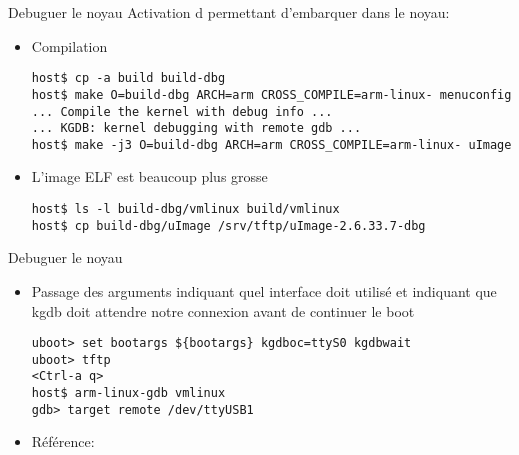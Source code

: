 \begin{frame}[fragile=singleslide]{Debuguer le noyau}
  Activation d  permettant d'embarquer  dans
  le noyau:
  \begin{itemize}
  \item Compilation
    \begin{lstlisting}
host$ cp -a build build-dbg
host$ make O=build-dbg ARCH=arm CROSS_COMPILE=arm-linux- menuconfig
... Compile the kernel with debug info ...
... KGDB: kernel debugging with remote gdb ...
host$ make -j3 O=build-dbg ARCH=arm CROSS_COMPILE=arm-linux- uImage
    \end{lstlisting} 
  \item L'image ELF est beaucoup plus grosse
    \begin{lstlisting}
host$ ls -l build-dbg/vmlinux build/vmlinux
host$ cp build-dbg/uImage /srv/tftp/uImage-2.6.33.7-dbg
    \end{lstlisting} 
  \end{itemize}
\end{frame}
\begin{frame}[fragile=singleslide]{Debuguer le noyau}
  \begin{itemize}
  \item  Passage des arguments   indiquant  quel interface
     doit utilisé et   indiquant que kgdb doit
    attendre notre connexion avant de continuer le boot
    \begin{lstlisting}
uboot> set bootargs ${bootargs} kgdboc=ttyS0 kgdbwait
uboot> tftp
<Ctrl-a q>
host$ arm-linux-gdb vmlinux 
gdb> target remote /dev/ttyUSB1
    \end{lstlisting} 
    \item Référence: 
  \end{itemize}
\end{frame}



